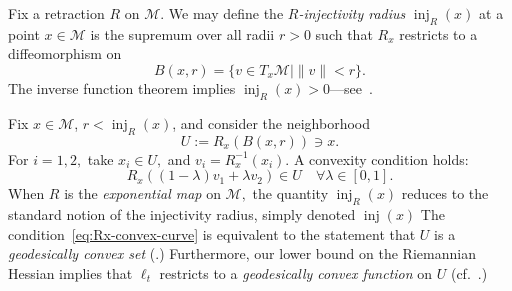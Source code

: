 \documentclass{article}
\numberwithin{equation}{section}
\newcommand{\cM}{{\mathcal{M}}}
\begin{document}
Fix a retraction $R$ on $\cM$. We may define the \emph{$R$-injectivity radius} $\operatorname{inj}_R (x)$ at a point $x\in \cM$ is the supremum over all radii $r>0$ such that $R_x$ restricts to a diffeomorphism on 
\begin{equation}\label{eq:ball-Bxr}
B(x , r) = \{ v \in T_x \cM \mid \| v \| < r \}.
\end{equation}
The inverse function theorem implies $\operatorname{inj}_R (x) > 0$---see~\cite[Corollary 4.17]{boumal}.

Fix $x\in \cM$, $r < \operatorname{inj}_R (x)$, and consider the neighborhood 
\[
U := R_x (B(x,r)) \ni x.
\]
For $i=1,2,$  take $x_i \in U,$ and 
$v_i = R_x^{-1} (x_i)$. 
A convexity condition holds:
    \begin{equation}
    \label{eq:Rx-convex-curve}
    R_x ((1-\lambda) v_1 + \lambda  v_2) \in U 
    \quad 
    \forall \lambda \in [0,1].
    \end{equation}
When $R$ is the \emph{exponential map} on $\cM,$ the quantity $\operatorname{inj}_R (x)$ reduces to the standard notion of the injectivity radius, simply denoted $\operatorname{inj} (x)$
The condition~\eqref{eq:Rx-convex-curve} is equivalent to the statement that $U$ is a \emph{geodesically convex set} (\cite[Definition 11.2]{boumal}.)
Furthermore, our lower bound on the Riemannian Hessian implies that $\ell_t$ restricts to a \emph{geodesically convex function} on $U$ (cf.~\cite[Theorem 11.23]{boumal}.)
\end{document}
